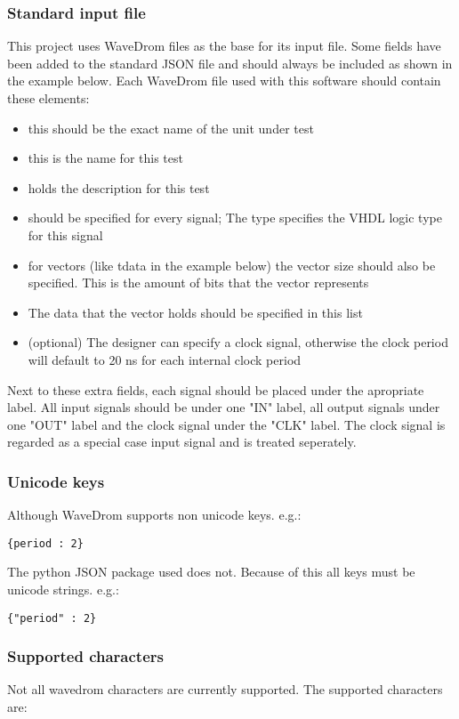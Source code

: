 \subsubsection{Standard input file}
This project uses WaveDrom files as the base for its input file. Some fields have been added to the standard JSON file and should always be included as shown in the example below. Each WaveDrom file used with this software should contain these elements:
\begin{itemize}
	\item [name(*):] this should be the exact name of the unit under test
	\item [test:] this is the name for this test
	\item [description:] holds the description for this test
	\item [type:] should be specified for every signal; The type specifies the VHDL logic type for this signal
	\item [vector\_size:] for vectors (like tdata in the example below) the vector size should also be specified. This is the amount of bits that the vector represents
	\item [data:] The data that the vector holds should be specified in this list
	\item [clock\_period:] (optional) The designer can specify a clock signal, otherwise the clock period will default to 20 ns for each internal clock period
\end{itemize}
Next to these extra fields, each signal should be placed under the apropriate label. All input signals should be under one "IN" label, all output signals under one "OUT" label and the clock signal under the "CLK" label. The clock signal is regarded as a special case input signal and is treated seperately.\newpage
\subsubsection{Unicode keys}
Although WaveDrom supports non unicode keys. e.g.:
\begin{lstlisting}[style=json]
{period : 2}
\end{lstlisting}
The python JSON package used does not. Because of this all keys must be unicode strings. e.g.:
\begin{lstlisting}[style=json]
{"period" : 2}
\end{lstlisting}
\subsubsection{Supported characters}
Not all wavedrom characters are currently supported. The supported characters are:
\npar


